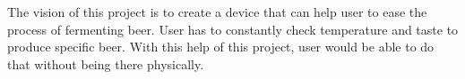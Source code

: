The vision of this project is to create a device that can help user to ease the process of fermenting beer. User has to constantly check temperature and taste to produce specific beer. With this help of this project, user would be able to do that without being there physically. 